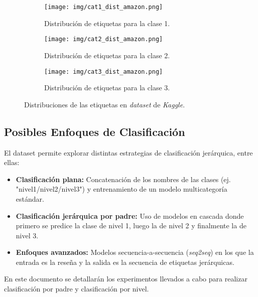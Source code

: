 \documentclass[12pt,letterpaper]{article}
\begin{document}
\begin{figure}[htp]
    \centering
    \begin{subfigure}[b]{0.6\textwidth}
        \centering
        \texttt{[image: img/cat1\_dist\_amazon.png]}
        \caption{Distribución de etiquetas para la clase 1.}
        \label{fig:cat1_amazon}
    \end{subfigure}
    \hfill
    \begin{subfigure}[b]{0.6\textwidth}
        \centering
        \texttt{[image: img/cat2\_dist\_amazon.png]}
        \caption{Distribución de etiquetas para la clase 2.}
        \label{fig:cat2_amazon}
    \end{subfigure}
    \hfill
    \begin{subfigure}[b]{0.6\textwidth}
        \centering
        \texttt{[image: img/cat3\_dist\_amazon.png]}
        \caption{Distribución de etiquetas para la clase 3.}
        \label{fig:cat3_amazon}
    \end{subfigure}
    \caption{Distribuciones de las etiquetas en \textit{dataset} de \textit{Kaggle}.}
    \label{fig:kaggle_amazon}
\end{figure}

\subsection{Posibles Enfoques de Clasificación}

El dataset permite explorar distintas estrategias de clasificación jerárquica, entre ellas:

\begin{itemize}
    \item \textbf{Clasificación plana:} Concatenación de los nombres de las clases (ej. "nivel1/nivel2/nivel3") y entrenamiento de un modelo multicategoría estándar.
    \item \textbf{Clasificación jerárquica por padre:} Uso de modelos en cascada donde primero se predice la clase de nivel 1, luego la de nivel 2 y finalmente la de nivel 3.
    \item \textbf{Enfoques avanzados:} Modelos secuencia-a-secuencia (\textit{seq2seq}) en los que la entrada es la reseña y la salida es la secuencia de etiquetas jerárquicas.
\end{itemize}

En este documento se detallarán los experimentos llevados a cabo para realizar clasificación por padre y clasificación por nivel.
\end{document}
